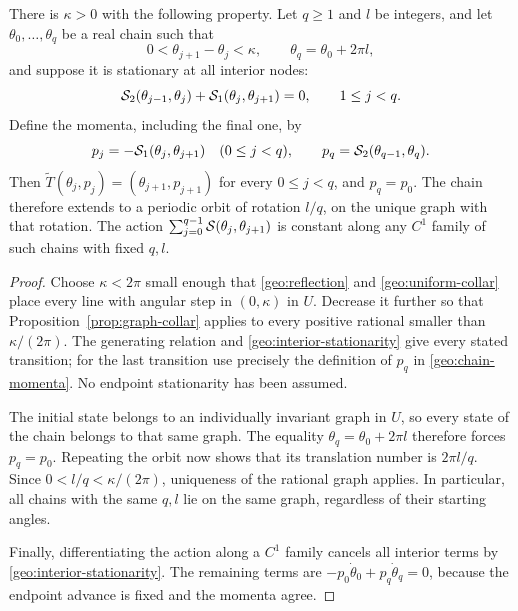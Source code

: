 \begin{lemma}\label{lem:stationary-closure}
There is $\kappa>0$ with the following property.  Let $q\ge1$ and $l$
be integers, and let $\theta_0,\ldots,\theta_q$ be a real chain such that
\[
 0<\theta_{j+1}-\theta_j<\kappa,\qquad
 \theta_q=\theta_0+2\pi l,
\]
and suppose it is stationary at all interior nodes:
\begin{equation}\label{geo:interior-stationarity}
 \mathcal{S}_2(\theta_{j-1},\theta_j)
             +\mathcal{S}_1(\theta_j,\theta_{j+1})=0,
 \qquad 1\le j<q.
\end{equation}
Define the momenta, including the final one, by
\begin{equation}\label{geo:chain-momenta}
 p_j=-\mathcal{S}_1(\theta_j,\theta_{j+1})\quad(0\le j<q),
 \qquad p_q=\mathcal{S}_2(\theta_{q-1},\theta_q).
\end{equation}
Then $\widetilde T(\theta_j,p_j)=(\theta_{j+1},p_{j+1})$ for every
$0\le j<q$, and $p_q=p_0$.  The chain therefore extends to a periodic
orbit of rotation $l/q$, on the unique graph with that rotation.
The action $\sum_{j=0}^{q-1}\mathcal{S}(\theta_j,\theta_{j+1})$ is constant
along any $C^1$ family of such chains with fixed $q,l$.
\end{lemma}

\begin{proof}
Choose $\kappa<2\pi$ small enough that
\eqref{geo:reflection} and \eqref{geo:uniform-collar} place every line
with angular step in $(0,\kappa)$ in $U$.  Decrease it further so that
Proposition~\ref{prop:graph-collar} applies to every positive rational
smaller than $\kappa/(2\pi)$.  The generating relation and
\eqref{geo:interior-stationarity} give every stated transition; for
the last transition use precisely the definition of $p_q$ in
\eqref{geo:chain-momenta}.  No endpoint stationarity has been assumed.

The initial state belongs to an individually invariant graph in $U$,
so every state of the chain belongs to that same graph.  The equality
$\theta_q=\theta_0+2\pi l$ therefore forces $p_q=p_0$.
Repeating the orbit now shows that its translation number is
$2\pi l/q$.  Since $0<l/q<\kappa/(2\pi)$, uniqueness of the rational
graph applies.  In particular, all chains with the same $q,l$ lie on
the same graph, regardless of their starting angles.

Finally, differentiating the action along a $C^1$ family cancels all
interior terms by \eqref{geo:interior-stationarity}.  The remaining
terms are $-p_0\dot\theta_0+p_q\dot\theta_q=0$, because the endpoint
advance is fixed and the momenta agree.
\end{proof}
